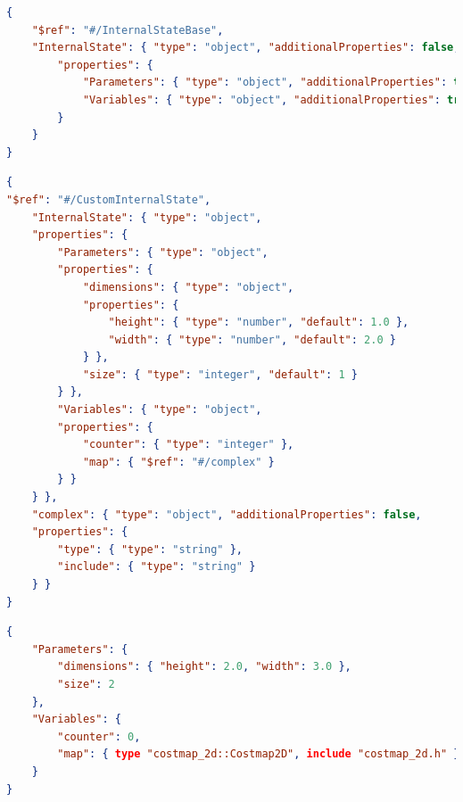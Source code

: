 \begin{lstlisting}[language=JSON, caption={Base schema of the internal state defined using JSON schema},label=lst:json-is-base]
{
	"$ref": "#/InternalStateBase",
	"InternalState": { "type": "object", "additionalProperties": false,
		"properties": {
			"Parameters": { "type": "object", "additionalProperties": true },
			"Variables": { "type": "object", "additionalProperties": true }
		}
	}
}
\end{lstlisting}

\begin{lstlisting}[language=JSON, caption={Internal state defined using JSON schema},label=lst:json-is]
{
"$ref": "#/CustomInternalState",
	"InternalState": { "type": "object",
	"properties": {
		"Parameters": { "type": "object",
		"properties": {
			"dimensions": { "type": "object",
			"properties": {
				"height": { "type": "number", "default": 1.0 },
				"width": { "type": "number", "default": 2.0 }
			} },
			"size": { "type": "integer", "default": 1 }
		} },
		"Variables": { "type": "object",
		"properties": {
			"counter": { "type": "integer" },
			"map": { "$ref": "#/complex" }
		} }
	} },
	"complex": { "type": "object", "additionalProperties": false,
	"properties": {
		"type": { "type": "string" },
		"include": { "type": "string" }
	} }
}
\end{lstlisting}

\begin{lstlisting}[language=JSON, caption={Internal state instance defined in JSON},label=lst:json-inst]
{
	"Parameters": {
		"dimensions": { "height": 2.0, "width": 3.0 },
		"size": 2
	},
	"Variables": {
		"counter": 0,
		"map": { type "costmap_2d::Costmap2D", include "costmap_2d.h" }
	}
}
\end{lstlisting}

